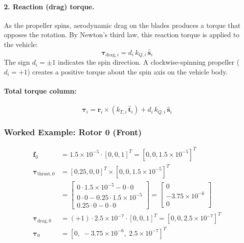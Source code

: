 \documentclass[12pt, a4paper]{article}
\newcommand{\btau}{\bm{\tau}}
\begin{document}
\paragraph{2. Reaction (drag) torque.}  As the propeller spins, aerodynamic drag on the blades produces a torque that opposes the rotation.  By Newton's third law, this reaction torque is applied to the vehicle:
\begin{equation}
    \btau_{\text{drag},i} = d_i \, k_{Q,i} \, \hat{\bm{s}}_i
\end{equation}
The sign $d_i = \pm 1$ indicates the spin direction.  A clockwise-spinning propeller ($d_i = +1$) creates a positive torque about the spin axis on the vehicle body.

\paragraph{Total torque column:}
\begin{equation}
    \btau_i = \bm{r}_i \times (k_{T,i} \, \hat{\bm{t}}_i) + d_i \, k_{Q,i} \, \hat{\bm{s}}_i
    \label{eq:torque_col}
\end{equation}

\subsubsection{Worked Example: Rotor 0 (Front)}

\begin{align}
    \bm{f}_0 &= 1.5 \times 10^{-5} \cdot [0, 0, 1]^T = [0, 0, 1.5 \times 10^{-5}]^T \\
    \btau_{\text{thrust},0} &= [0.25, 0, 0]^T \times [0, 0, 1.5 \times 10^{-5}]^T \\
    &= \begin{bmatrix}
        0 \cdot 1.5\times10^{-5} - 0 \cdot 0 \\
        0 \cdot 0 - 0.25 \cdot 1.5\times10^{-5} \\
        0.25 \cdot 0 - 0 \cdot 0
    \end{bmatrix}
    = \begin{bmatrix} 0 \\ -3.75 \times 10^{-6} \\ 0 \end{bmatrix} \\
    \btau_{\text{drag},0} &= (+1) \cdot 2.5 \times 10^{-7} \cdot [0, 0, 1]^T = [0, 0, 2.5 \times 10^{-7}]^T \\
    \btau_0 &= [0, \; -3.75 \times 10^{-6}, \; 2.5 \times 10^{-7}]^T
\end{align}
\end{document}
